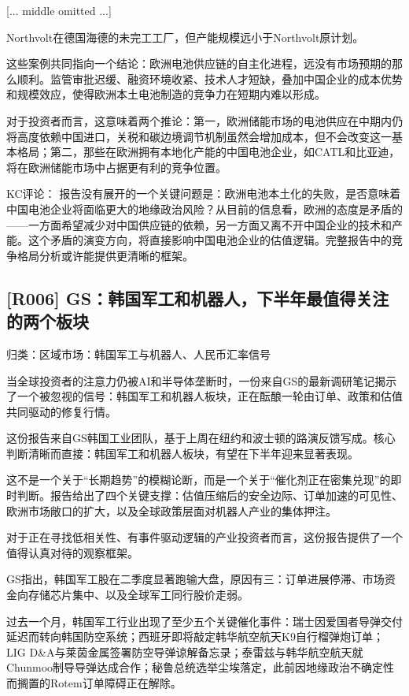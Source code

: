 \documentclass[11pt]{ctexart}
\begin{document}
[... middle omitted ...]

Northvolt在德国海德的未完工工厂，但产能规模远小于Northvolt原计划。

这些案例共同指向一个结论：欧洲电池供应链的自主化进程，远没有市场预期的那么顺利。监管审批迟缓、融资环境收紧、技术人才短缺，叠加中国企业的成本优势和规模效应，使得欧洲本土电池制造的竞争力在短期内难以形成。

对于投资者而言，这意味着两个推论：第一，欧洲储能市场的电池供应在中期内仍将高度依赖中国进口，关税和碳边境调节机制虽然会增加成本，但不会改变这一基本格局；第二，那些在欧洲拥有本地化产能的中国电池企业，如CATL和比亚迪，将在欧洲储能市场中占据更有利的竞争位置。

KC评论： 报告没有展开的一个关键问题是：欧洲电池本土化的失败，是否意味着中国电池企业将面临更大的地缘政治风险？从目前的信息看，欧洲的态度是矛盾的——一方面希望减少对中国供应链的依赖，另一方面又离不开中国企业的技术和产能。这个矛盾的演变方向，将直接影响中国电池企业的估值逻辑。完整报告中的竞争格局分析或许能提供更清晰的框架。

\subsection{[R006] GS：韩国军工和机器人，下半年最值得关注的两个板块}
{\small\color{refgray}归类：区域市场：韩国军工与机器人、人民币汇率信号}

当全球投资者的注意力仍被AI和半导体垄断时，一份来自GS的最新调研笔记揭示了一个被忽视的信号：韩国军工和机器人板块，正在酝酿一轮由订单、政策和估值共同驱动的修复行情。

这份报告来自GS韩国工业团队，基于上周在纽约和波士顿的路演反馈写成。核心判断清晰而直接：韩国军工和机器人板块，有望在下半年迎来显著表现。

这不是一个关于“长期趋势”的模糊论断，而是一个关于“催化剂正在密集兑现”的即时判断。报告给出了四个关键支撑：估值压缩后的安全边际、订单加速的可见性、欧洲市场敞口的扩大，以及全球政策层面对机器人产业的集体押注。

对于正在寻找低相关性、有事件驱动逻辑的产业投资者而言，这份报告提供了一个值得认真对待的观察框架。

GS指出，韩国军工股在二季度显著跑输大盘，原因有三：订单进展停滞、市场资金向存储芯片集中、以及全球军工同行股价走弱。

过去一个月，韩国军工行业出现了至少五个关键催化事件：瑞士因爱国者导弹交付延迟而转向韩国防空系统；西班牙即将敲定韩华航空航天K9自行榴弹炮订单；LIG D\&A与莱茵金属签署防空导弹谅解备忘录；泰雷兹与韩华航空航天就Chunmoo制导导弹达成合作；秘鲁总统选举尘埃落定，此前因地缘政治不确定性而搁置的Rotem订单障碍正在解除。
\end{document}
